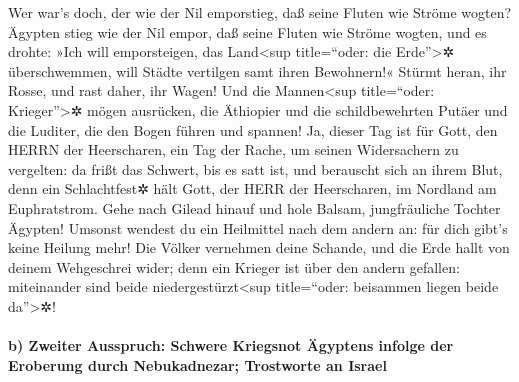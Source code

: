 Wer war's doch, der wie der Nil emporstieg, daß seine
Fluten wie Ströme wogten? Ägypten stieg wie der Nil empor,
daß seine Fluten wie Ströme wogten, und es drohte: »Ich will
emporsteigen, das Land\textless sup title=``oder: die
Erde''\textgreater✲ überschwemmen, will Städte vertilgen samt ihren
Bewohnern!« Stürmt heran, ihr Rosse, und rast daher, ihr
Wagen! Und die Mannen\textless sup title=``oder: Krieger''\textgreater✲
mögen ausrücken, die Äthiopier und die schildbewehrten Putäer und die
Luditer, die den Bogen führen und spannen! Ja, dieser Tag
ist für Gott, den HERRN der Heerscharen, ein Tag der Rache, um seinen
Widersachern zu vergelten: da frißt das Schwert, bis es satt ist, und
berauscht sich an ihrem Blut, denn ein Schlachtfest✲ hält Gott, der HERR
der Heerscharen, im Nordland am Euphratstrom. Gehe nach
Gilead hinauf und hole Balsam, jungfräuliche Tochter Ägypten! Umsonst
wendest du ein Heilmittel nach dem andern an: für dich gibt's keine
Heilung mehr! Die Völker vernehmen deine Schande, und die
Erde hallt von deinem Wehgeschrei wider; denn ein Krieger ist über den
andern gefallen: miteinander sind beide niedergestürzt\textless sup
title=``oder: beisammen liegen beide da''\textgreater✲!

\hypertarget{b-zweiter-ausspruch-schwere-kriegsnot-uxe4gyptens-infolge-der-eroberung-durch-nebukadnezar-trostworte-an-israel}{%
\paragraph{b) Zweiter Ausspruch: Schwere Kriegsnot Ägyptens infolge der
Eroberung durch Nebukadnezar; Trostworte an
Israel}\label{b-zweiter-ausspruch-schwere-kriegsnot-uxe4gyptens-infolge-der-eroberung-durch-nebukadnezar-trostworte-an-israel}}

